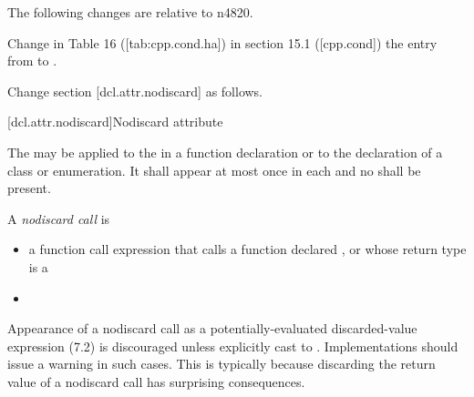 \documentclass[ebook,11pt,article]{memoir}
\begin{document}
The following changes are relative to n4820. 

Change in Table 16 ([tab:cpp.cond.ha]) in section 15.1 ([cpp.cond]) the entry  from  to .

Change section [dcl.attr.nodiscard] as follows. 

[dcl.attr.nodiscard]{Nodiscard attribute}%

\pnum
The  
may be applied to the 
in a function declaration or to the declaration of a class or enumeration.
It shall appear at most once in each  and
no  shall be present.

\pnum
{}
A \emph{nodiscard call} is 
\begin{itemize}
\item a function call expression 
that calls a function 
 declared , or
whose return type is a 
\item
{}
\end{itemize} 

\pnum
\begin{note}
Appearance of a nodiscard call as
a potentially-evaluated discarded-value expression (7.2)%
is discouraged unless explicitly cast to .
Implementations should issue a warning in such cases.
This is typically because discarding the return value
of a nodiscard call has surprising consequences.
\end{note}
\end{document}
